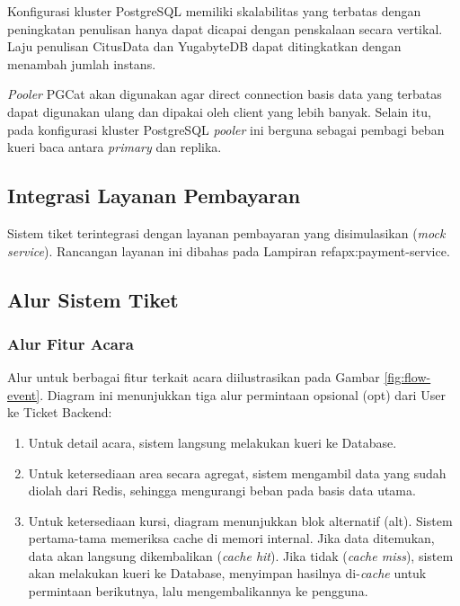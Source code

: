 Konfigurasi kluster PostgreSQL memiliki skalabilitas yang terbatas dengan peningkatan penulisan hanya dapat dicapai dengan penskalaan secara vertikal. Laju penulisan CitusData dan YugabyteDB dapat ditingkatkan dengan menambah jumlah instans.

\textit{Pooler} PGCat akan digunakan agar direct connection basis data yang terbatas dapat digunakan ulang dan dipakai oleh client yang lebih banyak. Selain itu, pada konfigurasi kluster PostgreSQL \textit{pooler} ini berguna sebagai pembagi beban kueri baca antara \textit{primary} dan replika.

\subsection{Integrasi Layanan Pembayaran}

Sistem tiket terintegrasi dengan layanan pembayaran yang disimulasikan (\textit{mock service}). Rancangan layanan ini dibahas pada Lampiran ref{apx:payment-service}.

\subsection{Alur Sistem Tiket}

\subsubsection{Alur Fitur Acara}

Alur untuk berbagai fitur terkait acara diilustrasikan pada Gambar \ref{fig:flow-event}. Diagram ini menunjukkan tiga alur permintaan opsional (opt) dari User ke Ticket Backend:

\begin{enumerate}
    \item Untuk detail acara, sistem langsung melakukan kueri ke Database.
    \item Untuk ketersediaan area secara agregat, sistem mengambil data yang sudah diolah dari Redis, sehingga mengurangi beban pada basis data utama.
    \item Untuk ketersediaan kursi, diagram menunjukkan blok alternatif (alt). Sistem pertama-tama memeriksa cache di memori internal. Jika data ditemukan, data akan langsung dikembalikan (\textit{cache hit}). Jika tidak (\textit{cache miss}), sistem akan melakukan kueri ke Database, menyimpan hasilnya di-\textit{cache} untuk permintaan berikutnya, lalu mengembalikannya ke pengguna.
\end{enumerate}

